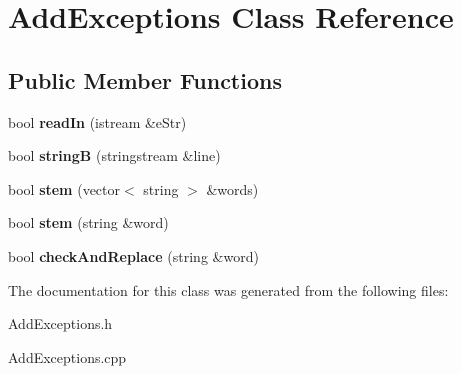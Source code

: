 \section{Add\+Exceptions Class Reference}
\label{class_add_exceptions}
\subsection*{Public Member Functions}
\begin{DoxyCompactItemize}
\item 
\mbox{\label{class_add_exceptions_a828c6e6dd8e484ae94247545e9053c76}} 
bool {\bfseries read\+In} (istream \&e\+Str)
\item 
\mbox{\label{class_add_exceptions_ae7593264f36b8c3e2cea80f584cc9a0d}} 
bool {\bfseries stringB} (stringstream \&line)
\item 
\mbox{\label{class_add_exceptions_af0783769844928f00c474eca8cc08656}} 
bool {\bfseries stem} (vector$<$ string $>$ \&words)
\item 
\mbox{\label{class_add_exceptions_a5aa5de57ccf7ee110bb4b31a4c774e51}} 
bool {\bfseries stem} (string \&word)
\item 
\mbox{\label{class_add_exceptions_aec9a6a58c4cc139e13721319468067ee}} 
bool {\bfseries check\+And\+Replace} (string \&word)
\end{DoxyCompactItemize}


The documentation for this class was generated from the following files\+:\begin{DoxyCompactItemize}
\item 
Add\+Exceptions.\+h\item 
Add\+Exceptions.\+cpp\end{DoxyCompactItemize}
